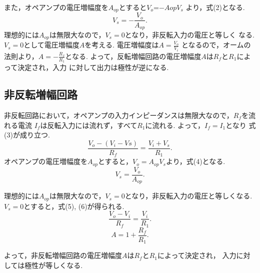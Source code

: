 \documentclass[twocolumn, 10pt,a4j]{jsarticle}
\begin{document}
    また，オペアンプの電圧増幅度を$A_{op}$とすると$V_{o}$=$-A{op}V_{s}$
    より，式(2)となる.
      \begin{equation}
        V_{s} = - \frac{V_{o}}{A_{op}}.
      \end{equation}
    理想的には$A_{op}$は無限大なので，$V_{s}=0$となり，非反転入力の電圧と等しく
    なる. $V_{s}=0$として電圧増幅度$A$を考える. 電圧増幅度は$A=\frac{V_{o}}{V_{i}}$
    となるので，オームの法則より，$A= - \frac{R_{f}}{R_{1}}$となる.
    よって，反転増幅回路の電圧増幅度$A$は$R_{f}$と$R_{1}$によって決定され，入力
    に対して出力は極性が逆になる.



  \subsection{非反転増幅回路}
    非反転回路において，オペアンプの入力インピーダンスは無限大なので，$R_{f}$を流れる電流
    $I_{f}$は反転入力には流れず，すべて$R_{1}$に流れる. よって，$I_{f} = I_{1}$となり
    式(3)が成り立つ.
      \begin{equation}
        \frac{V_{o} - (V_{i} - V{s})}{R_{f}} = \frac{V_{i} + V_{s}}{R_{1}}.
      \end{equation}
    オペアンプの電圧増幅度を$A_{op}$とすると，$V_{o} = A_{op}V_{s}$より，式(4)となる.
      \begin{equation}
        V_{s} = \frac{V_{o}}{A_{op}}.
      \end{equation}

    理想的には$A_{op}$は無限大なので，$V_{s} = 0$となり，非反転入力の電圧と等しくなる.
    $V_{s} = 0$とすると，式(5), (6)が得られる.
      \begin{equation}
        \frac{V_{o} - V_{i}}{R_{f}} = \frac{V_{i}}{R_{1}}.
      \end{equation}
      \begin{equation}
        A = 1 + \frac{R_{f}}{R_{1}}.
      \end{equation}

    よって，非反転増幅回路の電圧増幅度$A$は$R_{f}$と$R_{1}$によって決定され，
    入力に対しては極性が等しくなる.
\end{document}
